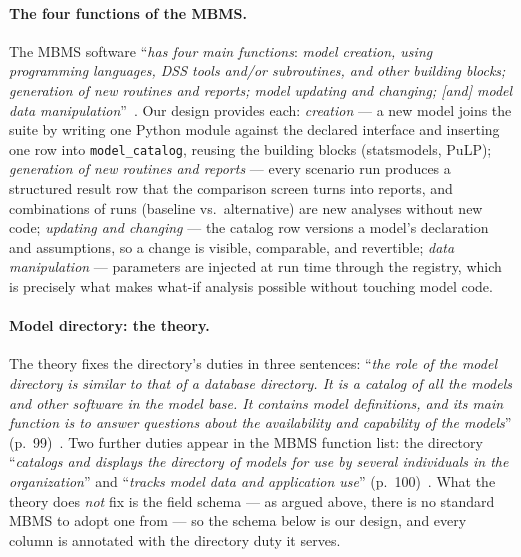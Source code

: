 \paragraph{The four functions of the MBMS.}
The MBMS software ``\emph{has four main functions}: \emph{model creation, using programming languages, DSS tools and/or subroutines, and other building blocks; generation of new routines and reports; model updating and changing; [and] model data manipulation}''~\cite{turban2011}. Our design provides each: \emph{creation} --- a new model joins the suite by writing one Python module against the declared interface and inserting one row into \texttt{model\_catalog}, reusing the building blocks (statsmodels, PuLP); \emph{generation of new routines and reports} --- every scenario run produces a structured result row that the comparison screen turns into reports, and combinations of runs (baseline vs.\ alternative) are new analyses without new code; \emph{updating and changing} --- the catalog row versions a model's declaration and assumptions, so a change is visible, comparable, and revertible; \emph{data manipulation} --- parameters are injected at run time through the registry, which is precisely what makes what-if analysis possible without touching model code.

\paragraph{Model directory: the theory.}
The theory fixes the directory's duties in three sentences: ``\emph{the role of the model directory is similar to that of a database directory. It is a catalog of all the models and other software in the model base. It contains model definitions, and its main function is to answer questions about the availability and capability of the models}'' (p.~99)~\cite{turban2011}. Two further duties appear in the MBMS function list: the directory ``\emph{catalogs and displays the directory of models for use by several individuals in the organization}'' and ``\emph{tracks model data and application use}'' (p.~100)~\cite{turban2011}. What the theory does \emph{not} fix is the field schema --- as argued above, there is no standard MBMS to adopt one from --- so the schema below is our design, and every column is annotated with the directory duty it serves.


